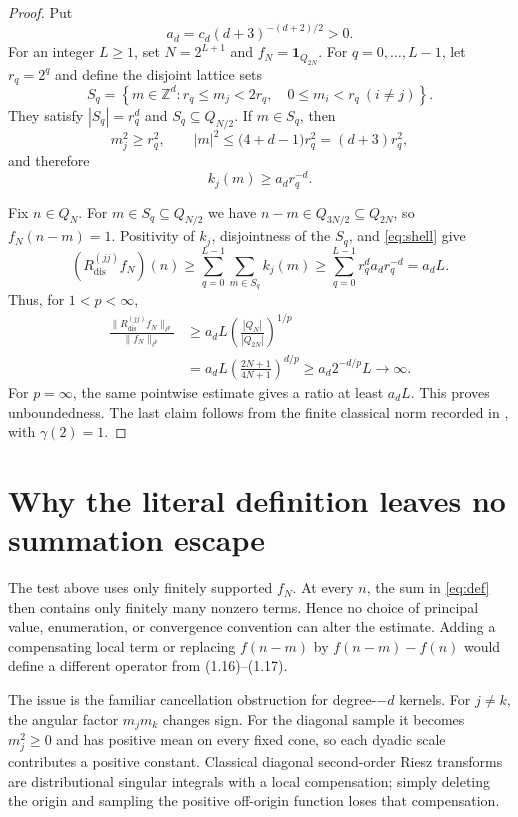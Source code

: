 \documentclass[11pt]{article}
\newcommand{\Z}{\mathbb Z}
\newcommand{\one}{\mathbf 1}
\newcommand{\Qbox}[1]{Q_{#1}}
\begin{document}
\begin{proof}
Put
\[
 a_d=c_d(d+3)^{-(d+2)/2}>0.
\]
For an integer $L\geq1$, set $N=2^{L+1}$ and
$f_N=\one_{\Qbox{2N}}$.  For $q=0,\dots,L-1$, let $r_q=2^q$ and define the
disjoint lattice sets
\[
 S_q=\left\{m\in\Z^d:
 r_q\leq m_j<2r_q,\quad 0\leq m_i<r_q\ (i\neq j)\right\}.
\]
They satisfy $|S_q|=r_q^d$ and $S_q\subseteq\Qbox{N/2}$.  If $m\in S_q$,
then
\[
 m_j^2\geq r_q^2,
 \qquad
 |m|^2\leq \bigl(4+d-1\bigr)r_q^2=(d+3)r_q^2,
\]
and therefore
\begin{equation}\label{eq:shell}
 k_j(m)\geq a_d r_q^{-d}.
\end{equation}

Fix $n\in\Qbox N$.  For $m\in S_q\subseteq\Qbox{N/2}$ we have
$n-m\in\Qbox{3N/2}\subseteq\Qbox{2N}$, so $f_N(n-m)=1$.  Positivity of
$k_j$, disjointness of the $S_q$, and \eqref{eq:shell} give
\[
 (R_{\mathrm{dis}}^{(jj)}f_N)(n)
 \geq \sum_{q=0}^{L-1}\sum_{m\in S_q}k_j(m)
 \geq \sum_{q=0}^{L-1}r_q^d a_d r_q^{-d}
 =a_dL.
\]
Thus, for $1<p<\infty$,
\begin{align*}
 \frac{\|R_{\mathrm{dis}}^{(jj)}f_N\|_{\ell^p}}
      {\|f_N\|_{\ell^p}}
 &\geq a_dL\left(\frac{|\Qbox N|}{|\Qbox{2N}|}\right)^{1/p}\\
 &=a_dL\left(\frac{2N+1}{4N+1}\right)^{d/p}
 \geq a_d2^{-d/p}L\longrightarrow\infty.
\end{align*}
For $p=\infty$, the same pointwise estimate gives a ratio at least $a_dL$.
This proves unboundedness.  The last claim follows from the finite classical
norm recorded in \cite[(1.9), (1.24)]{BK}, with $\gamma(2)=1$.
\end{proof}

\section{Why the literal definition leaves no summation escape}

The test above uses only finitely supported $f_N$.  At every $n$, the sum in
\eqref{eq:def} then contains only finitely many nonzero terms.  Hence no
choice of principal value, enumeration, or convergence convention can alter
the estimate.  Adding a compensating local term or replacing $f(n-m)$ by
$f(n-m)-f(n)$ would define a different operator from (1.16)--(1.17).

The issue is the familiar cancellation obstruction for degree-$-d$ kernels.
For $j\neq k$, the angular factor $m_jm_k$ changes sign.  For the diagonal
sample it becomes $m_j^2\geq0$ and has positive mean on every fixed cone, so
each dyadic scale contributes a positive constant.  Classical diagonal
second-order Riesz transforms are distributional singular integrals with a
local compensation; simply deleting the origin and sampling the positive
off-origin function loses that compensation.
\end{document}
